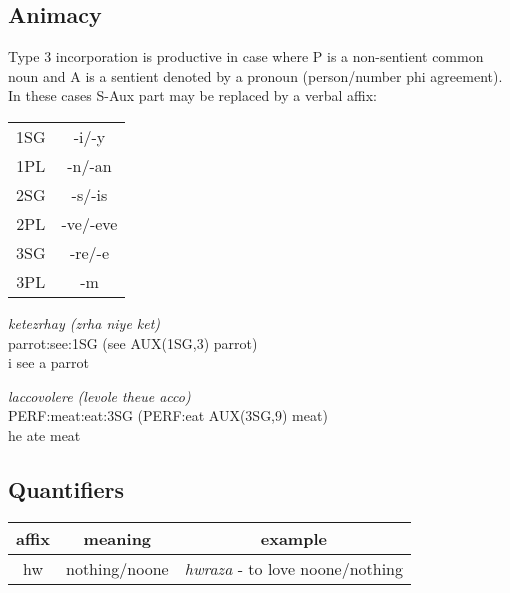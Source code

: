 \documentclass[11pt]{article}
\begin{document}
\subsection{Animacy}
Type 3 incorporation is productive in case where P is a non-sentient common noun and A is a sentient denoted by a pronoun (person/number phi agreement). In these cases S-Aux part may be replaced by a verbal affix:

\begin{tabular}{c | c}
  1SG & -i/-y \\
  1PL & -n/-an \\
  2SG & -s/-is \\
  2PL & -ve/-eve \\
  3SG & -re/-e \\
  3PL & -m \\
\end{tabular}

\begin{exe}
\ex 
\gll \textit{ketezrhay (zrha niye ket)} \\
  parrot:see:1SG (see AUX(1SG,3) parrot) \\
\trans i see a parrot

\ex 
\gll \textit{laccovolere (levole theue acco)} \\
  PERF:meat:eat:3SG (PERF:eat AUX(3SG,9) meat) \\
\trans he ate meat
\end{exe}

\subsection{Quantifiers}

\begin{center}
\begin{tabular}{c | c | c}
affix & meaning & example \\ \hline
hw & nothing/noone & \textit{hwraza} - to love noone/nothing \\
\end{tabular}
\end{center}
\end{document}
